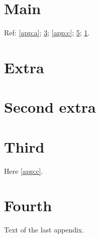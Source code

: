 \documentclass{report}
\begin{document}
\chapter{Main}\label{main}
Ref: \ref{app:a}; \ref{app:b}; \ref{app:c}; \ref{app:d}; \ref{main}.
\appendix
\chapter{Extra\label{app:a}}
\chapter{Second extra}\label{app:b}
\chapter{Third\label{app:c}}
Here \ref{app:c}.
\chapter{Fourth}\label{app:d}
Text of the last appendix.
\end{document}
